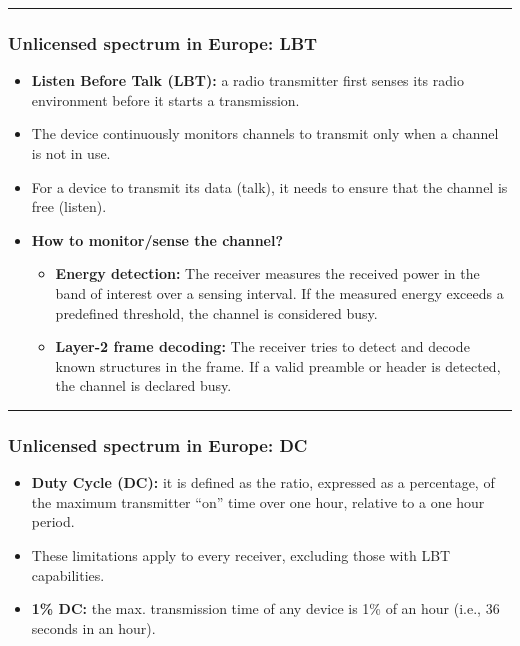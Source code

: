 \documentclass[a4paper, 12pt]{book} %
\begin{document}
\begin{center}\rule{0.5\linewidth}{0.5pt}\end{center}

\subsubsection{Unlicensed spectrum in Europe:
LBT}\label{unlicensed-spectrum-in-europe-lbt}

\begin{itemize}
\tightlist
\item
  \textbf{Listen Before Talk (LBT):} a radio transmitter first senses
  its radio environment before it starts a transmission.
\item
  The device continuously monitors channels to transmit only when a
  channel is not in use.
\item
  For a device to transmit its data (talk), it needs to ensure that the
  channel is free (listen).
\item
  \textbf{How to monitor/sense the channel?}

  \begin{itemize}
  \tightlist
  \item
    \textbf{Energy detection:} The receiver measures the received power
    in the band of interest over a sensing interval. If the measured
    energy exceeds a predefined threshold, the channel is considered
    busy.\\
  \item
    \textbf{Layer-2 frame decoding:} The receiver tries to detect and
    decode known structures in the frame. If a valid preamble or header
    is detected, the channel is declared busy.
  \end{itemize}
\end{itemize}

\begin{center}\rule{0.5\linewidth}{0.5pt}\end{center}

\subsubsection{Unlicensed spectrum in Europe:
DC}\label{unlicensed-spectrum-in-europe-dc}

\begin{itemize}
\tightlist
\item
  \textbf{Duty Cycle (DC):} it is defined as the ratio, expressed as a
  percentage, of the maximum transmitter ``on'' time over one hour,
  relative to a one hour period.
\item
  These limitations apply to every receiver, excluding those with LBT
  capabilities.
\item
  \textbf{1\% DC:} the max. transmission time of any device is 1\% of an
  hour (i.e., 36 seconds in an hour).
\end{itemize}
\end{document}
